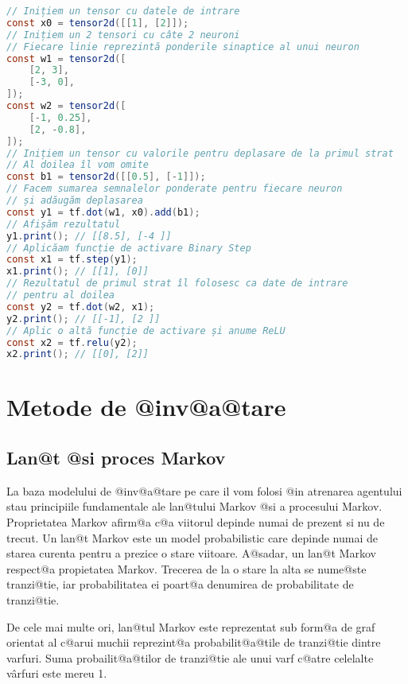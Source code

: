 \begin{lstlisting}[language=Java, caption=Exemple de folosire a bibliotecii Tensorflow, label={lst:exemple-tensor-nn}]
// Inițiem un tensor cu datele de intrare
const x0 = tensor2d([[1], [2]]);
// Inițiem un 2 tensori cu câte 2 neuroni
// Fiecare linie reprezintă ponderile sinaptice al unui neuron
const w1 = tensor2d([
    [2, 3],
    [-3, 0],
]);
const w2 = tensor2d([
    [-1, 0.25],
    [2, -0.8],
]);
// Inițiem un tensor cu valorile pentru deplasare de la primul strat
// Al doilea îl vom omite
const b1 = tensor2d([[0.5], [-1]]);
// Facem sumarea semnalelor ponderate pentru fiecare neuron
// și adăugăm deplasarea
const y1 = tf.dot(w1, x0).add(b1);
// Afișăm rezultatul
y1.print(); // [[8.5], [-4 ]]
// Aplicăam funcție de activare Binary Step
const x1 = tf.step(y1);
x1.print(); // [[1], [0]]
// Rezultatul de primul strat îl folosesc ca date de intrare
// pentru al doilea
const y2 = tf.dot(w2, x1);
y2.print(); // [[-1], [2 ]]
// Aplic o altă funcție de activare și anume ReLU
const x2 = tf.relu(y2);
x2.print(); // [[0], [2]]
\end{lstlisting}

\chapter{Metode de @inv@a@tare}

\section{Lan@t @si proces Markov}


La baza modelului de @inv@a@tare pe care il vom folosi @in atrenarea agentului stau principiile fundamentale ale lan@tului Markov @si a procesului Markov.
Proprietatea Markov afirm@a c@a viitorul depinde numai de prezent si nu de trecut. Un lan@t Markov este un model probabilistic care depinde numai de starea curenta pentru a prezice o stare viitoare. A@sadar, un lan@t Markov respect@a propietatea Markov.
Trecerea de la o stare la alta se nume@ste tranzi@tie, iar probabilitatea ei poart@a denumirea de probabilitate de tranzi@tie.

De cele mai multe ori, lan@tul Markov este reprezentat sub form@a de graf orientat al c@arui muchii reprezint@a probabilit@a@tile de tranzi@tie dintre varfuri. Suma probailit@a@tilor de tranzi@tie ale unui varf c@atre celelalte v\^ arfuri este mereu 1.

